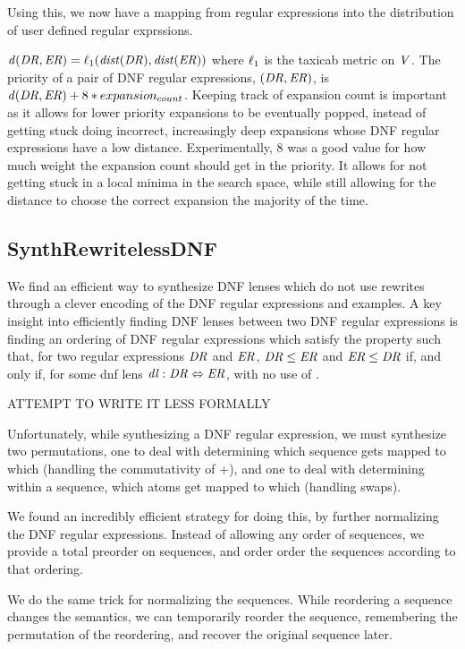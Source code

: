 \documentclass[numbers]{sigplanconf}
\begin{document}
Using this, we now have a mapping from regular expressions into the distribution
of user defined regular exprssions.

$\mathit{d}(\mathit{DR},\mathit{ER})=\ell_1(\mathit{dist}(\mathit{DR}),\mathit{dist}(\mathit{ER}))$
where $\ell_1$ is the taxicab metric on $\mathit{V}{}$.
The priority of a pair of DNF regular expressions, $(\mathit{DR}{},\mathit{ER}{})$,
is $\mathit{d}(\mathit{DR}{},\mathit{ER}{})+8*expansion_{count}$.
Keeping track of expansion count is important as it allows for lower priority
expansions to be eventually popped, instead of getting stuck doing incorrect,
increasingly deep expansions whose DNF regular expressions have a low distance.
Experimentally, 8 was a good value for how much weight the expansion
count should get in the priority.  It allows for not getting stuck in a local
minima in the search space, while still allowing for the distance to choose the
correct expansion the majority of the time.

\subsection{SynthRewritelessDNF}
We find an efficient way to synthesize DNF lenses which do not use rewrites
through a clever encoding of the DNF regular expressions and examples.
A key insight into efficiently finding DNF lenses between two DNF regular
expressions is finding an ordering of DNF regular expressions which satisfy the
property such that, for two regular expressions $\mathit{DR}$ and $\mathit{ER}$,
$\mathit{DR} \leq \mathit{ER}$ and $\mathit{ER} \leq \mathit{DR}$ if, and only if,
for some dnf lens $\mathit{dl} : \mathit{DR} \Leftrightarrow \mathit{ER}$,
with no use of \DNFRewriteLensRule{}.

ATTEMPT TO WRITE IT LESS FORMALLY

Unfortunately, while synthesizing a DNF regular expression, we must synthesize
two permutations, one to deal with determining which sequence
gets mapped to which (handling the commutativity of +), and one to deal
with determining within a sequence, which atoms get mapped to which
(handling swaps).

We found an incredibly efficient strategy for doing this, by further normalizing
the DNF regular expressions.  Instead of allowing any order of sequences, we
provide a total preorder on sequences, and order order the sequences
according to that ordering.

We do the same trick for normalizing the sequences.  While reordering a sequence
changes the semantics, we can temporarily reorder the sequence, remembering the
permutation of the reordering, and recover the original sequence later.
\end{document}
